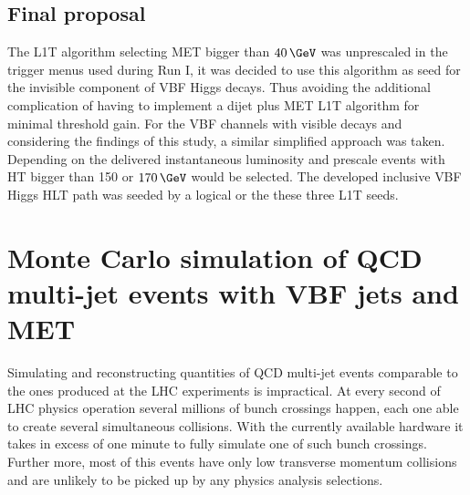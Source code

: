 \subsection{Final proposal}


The \gls{L1T} algorithm selecting \gls{MET} bigger than $40\,\GeV$ was unprescaled in the trigger menus used during Run I, it was decided to use this algorithm as seed for the invisible component of \gls{VBF} Higgs decays. Thus avoiding the additional complication of having to implement a dijet plus \gls{MET} \gls{L1T} algorithm for minimal threshold gain. For the \gls{VBF} channels with visible decays and considering the findings of this study, a similar simplified approach was taken. Depending on the delivered instantaneous luminosity and prescale events with \gls{HT} bigger than 150 or $170\,\GeV$ would be selected. The developed inclusive \gls{VBF} Higgs \gls{HLT} path was seeded by a logical or the these three \gls{L1T} seeds.

\section{Monte Carlo simulation of QCD multi-jet events with VBF jets and MET}
\label{SECTION:PreparationParkedDataAnalysis_QCDVBFMET}

% 
% 


Simulating and reconstructing quantities of \gls{QCD} multi-jet events comparable to the ones produced at the \gls{LHC} experiments is impractical. At every second of \gls{LHC} physics operation several millions of bunch crossings happen, each one able to create several simultaneous collisions. With the currently available hardware it takes in excess of one minute to fully simulate one of such bunch crossings. Further more, most of this events have only low transverse momentum collisions and are unlikely to be picked up by any physics analysis selections.

